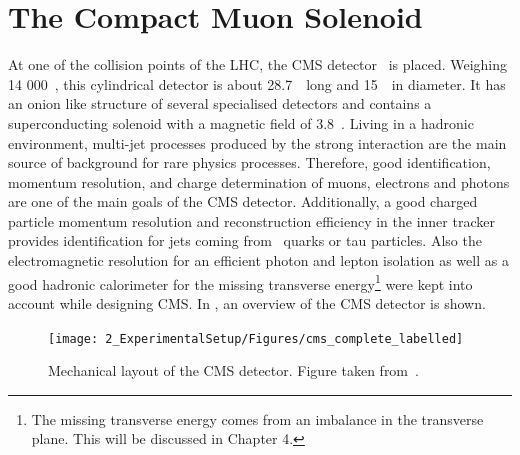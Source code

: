 \section{The Compact Muon Solenoid}
\label{sec:CMS}
At one of the collision points of the LHC, the CMS detector~\cite{CMS, Bayatian:2006zz,Bayatian:922757} is placed. Weighing 14 000~\tonne, this cylindrical detector is about 28.7~\meter\ long and 15~\meter\ in diameter. It has an onion like structure of several specialised detectors and contains a superconducting solenoid with a magnetic field of 3.8~\Tesla. Living in a hadronic environment, multi-jet processes produced by the strong interaction are the main source of background for rare physics processes. Therefore, good identification, momentum resolution, and charge determination of muons, electrons and photons are one of the main goals of the CMS detector. Additionally, a good charged particle momentum resolution and reconstruction efficiency in the inner tracker provides identification for jets coming from \Pbottom\ quarks or tau particles. Also the electromagnetic resolution for an efficient photon and lepton isolation as well as a good hadronic calorimeter for the missing transverse energy\footnote{The missing transverse energy comes from an imbalance in the transverse plane. This will be discussed in Chapter 4.} were kept into account while designing CMS. In , an overview of the CMS detector is shown. 
\begin{figure}[htbp]
	\centering
	\texttt{[image: 2\_ExperimentalSetup/Figures/cms\_complete\_labelled]}
	\caption{Mechanical layout of the CMS detector. Figure taken from~\cite{CMSdraw}.}
	\label{fig:CMS}
\end{figure}



